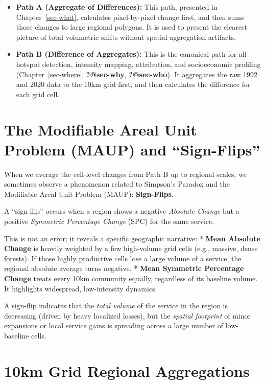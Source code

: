 \documentclass[
  letterpaper,
  DIV=11,
  numbers=noendperiod]{scrreprt}
\providecommand{\tightlist}{%
  \setlength{\itemsep}{0pt}\setlength{\parskip}{0pt}}
\begin{document}
\begin{itemize}
\tightlist
\item
  \textbf{Path A (Aggregate of Differences):} This path, presented in
  Chapter~\ref{sec-what}, calculates pixel-by-pixel change first, and
  then sums those changes to large regional polygons. It is used to
  present the clearest picture of total volumetric shifts without
  spatial aggregation artifacts.
\item
  \textbf{Path B (Difference of Aggregates):} This is the canonical path
  for all hotspot detection, intensity mapping, attribution, and
  socioeconomic profiling (Chapter~\ref{sec-where}, \textbf{?@sec-why},
  \textbf{?@sec-who}). It aggregates the raw 1992 and 2020 data to the
  10km grid first, and then calculates the difference for each grid
  cell.
\end{itemize}

\section{The Modifiable Areal Unit Problem (MAUP) and
``Sign-Flips''}\label{the-modifiable-areal-unit-problem-maup-and-sign-flips}

When we average the cell-level changes from Path B up to regional
scales, we sometimes observe a phenomenon related to Simpson's Paradox
and the Modifiable Areal Unit Problem (MAUP): \textbf{Sign-Flips}.

A ``sign-flip'' occurs when a region shows a negative \emph{Absolute
Change} but a positive \emph{Symmetric Percentage Change} (SPC) for the
same service.

This is not an error; it reveals a specific geographic narrative: *
\textbf{Mean Absolute Change} is heavily weighted by a few high-volume
grid cells (e.g., massive, dense forests). If those highly productive
cells lose a large volume of a service, the regional absolute average
turns negative. * \textbf{Mean Symmetric Percentage Change} treats every
10km community equally, regardless of its baseline volume. It highlights
widespread, low-intensity dynamics.

A sign-flip indicates that the \emph{total volume} of the service in the
region is decreasing (driven by heavy localized losses), but the
\emph{spatial footprint} of minor expansions or local service gains is
spreading across a large number of low-baseline cells.

\section{10km Grid Regional
Aggregations}\label{km-grid-regional-aggregations}
\end{document}

